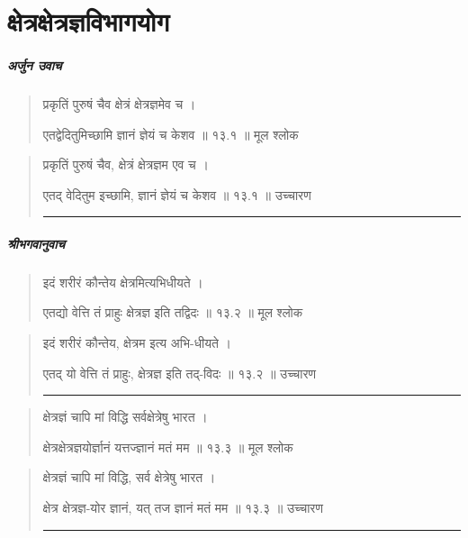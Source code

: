 \chapter{\sanskrit क्षेत्रक्षेत्रज्ञविभागयोग} 
\paragraph{\sanskrit अर्जुन उवाच}
\begin{quotation} 
प्रकृतिं पुरुषं चैव क्षेत्रं क्षेत्रज्ञमेव च  ।  

एतद्वेदितुमिच्छामि ज्ञानं ज्ञेयं च केशव  ॥ १३.१ ॥  मूल श्लोक
\end{quotation}

\begin{quotation}

प्रकृतिं पुरुषं चैव, क्षेत्रं क्षेत्रज्ञम एव च  ।  

एतद् वेदितुम इच्छामि, ज्ञानं ज्ञेयं च केशव  ॥ १३.१ ॥  उच्चारण

\noindent\rule{16cm}{0.4pt} 
\end{quotation}




\paragraph{\sanskrit श्रीभगवानुवाच}
\begin{quotation} 
इदं शरीरं कौन्तेय क्षेत्रमित्यभिधीयते ।  

एतद्यो वेत्ति तं प्राहुः क्षेत्रज्ञ इति तद्विदः ॥ १३.२ ॥  मूल श्लोक
\end{quotation}

\begin{quotation}

इदं शरीरं कौन्तेय, क्षेत्रम इत्य अभि-धीयते ।  

एतद् यो वेत्ति तं प्राहुः, क्षेत्रज्ञ इति तद्-विदः ॥ १३.२ ॥  उच्चारण

\noindent\rule{16cm}{0.4pt} 
\end{quotation}


\begin{quotation}

क्षेत्रज्ञं चापि मां विद्धि सर्वक्षेत्रेषु भारत ।  

क्षेत्रक्षेत्रज्ञयोर्ज्ञानं यत्तज्ज्ञानं मतं मम  ॥ १३.३ ॥  मूल श्लोक
\end{quotation}

\begin{quotation}

क्षेत्रज्ञं चापि मां विद्धि, सर्व क्षेत्रेषु भारत ।  

क्षेत्र क्षेत्रज्ञ-योर ज्ञानं, यत् तज ज्ञानं मतं मम  ॥ १३.३ ॥  उच्चारण

\noindent\rule{16cm}{0.4pt} 
\end{quotation}


